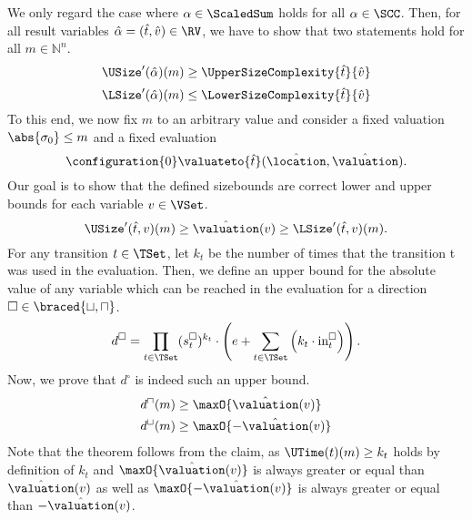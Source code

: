 We only regard the case where $\alpha \in \ScaledSum$ holds for all $\alpha \in \SCC$.
Then, for all result variables $\hat{\alpha} = (\hat{t}, \hat{v}) \in \RV$, we have to show that two statements hold for all $m \in \mathbb{N}^n$.
\[ \USize'(\hat{\alpha})(m) \geq \UpperSizeComplexity{\hat{t}}{\hat{v}} \]
\[ \LSize'(\hat{\alpha})(m) \leq \LowerSizeComplexity{\hat{t}}{\hat{v}} \]
To this end, we now fix $m$ to an arbitrary value and consider a fixed valuation $\abs{\sigma_0} \leq m$ and a fixed evaluation
\[ \configuration{0} \valuateto{\hat{t}} (\hat{\location}, \hat{\valuation}). \]
Our goal is to show that the defined sizebounds are correct lower and upper bounds for each variable $v \in \VSet$.
\begin{equation} \label{eq:sizebound_target}
  \USize'(\hat{t}, v)(m) \geq \hat{\valuation}(v) \geq \LSize'(\hat{t}, v)(m).
\end{equation}
For any transition $t \in \TSet$, let $k_t$ be the number of times that the transition t was used in the evaluation.
Then, we define an upper bound for the absolute value of any variable which can be reached in the evaluation for a direction $\square \in \braced{\sqcup, \sqcap}$.
\[ d^\square = \prod_{t \in \TSet} (s^\square_t)^{k_t} \cdot \left( e + \sum_{t \in \TSet} \left( k_t \cdot \text{in}^\square_t \right) \right). \]
Now, we prove that $d^\square$ is indeed such an upper bound.
\begin{equation} \label{eq:sizebound_hypothesis}
  \begin{split}
    d^\sqcap(m) & \geq \maxO{\hat{\valuation}(v)} \\
    d^\sqcup(m) & \geq \maxO{-\hat{\valuation}(v)}
  \end{split}
\end{equation}
Note that the theorem follows from the claim, as $\UTime(t)(m) \geq k_t$ holds by definition of $k_t$ and $\maxO{\hat{\valuation}(v)}$ is always greater or equal than $\hat{\valuation}(v)$ as well as $\maxO{-\hat{\valuation}(v)}$ is always greater or equal than $-\hat{\valuation}(v)$.

